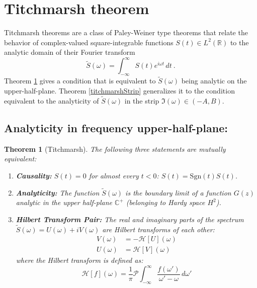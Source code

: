 \documentclass[a4paper,11pt]{article}
\newtheorem{theorem}{Theorem}
\theoremstyle{definition}
\begin{document}
\section{Titchmarsh theorem}\label{app:titchmarsh}

Titchmarsh theorems are a class of Paley-Weiner type theorems that relate the behavior of complex-valued square-integrable functions $S(t)\in L^2(\mathbb{R})$ to the analytic domain of their Fourier transform
\begin{equation}
    \tilde{S}(\omega) = \int_{-\infty}^{\infty} S(t) e^{i\omega t} \, dt\ .
\end{equation}
Theorem \ref{titchmarshUHP} gives a condition that is equivalent to $\tilde{S}(\omega)$ being analytic on the upper-half-plane. Theorem \ref{titchmarshStrip} generalizes it to the condition equivalent to the analyticity of $\tilde{S}(\omega)$ in the strip $\Im(\omega)\in (-A,B)$.

\subsection{Analyticity in frequency upper-half-plane:}
\begin{theorem}[Titchmarsh]\label{titchmarshUHP}
The following three statements are mutually equivalent:

\begin{enumerate}
    \item \textbf{Causality:} $S(t) = 0$ for almost every $t < 0$: $S(t)=\text{Sgn}(t)S(t)$.
    \item \textbf{Analyticity:} The function $\tilde{S}(\omega)$ is the boundary limit of a function $G(z)$ analytic in the upper half-plane $\mathbb{C}^+$ (belonging to Hardy space $H^2$).
    \item \textbf{Hilbert Transform Pair:}
    The real and imaginary parts of the spectrum $\tilde{S}(\omega) = U(\omega) + i V(\omega)$ are Hilbert transforms of each other:
    \begin{align}
        V(\omega) &= -\mathcal{H}[U](\omega) \\
        U(\omega) &= \mathcal{H}[V](\omega)
    \end{align}
    where the Hilbert transform is defined as:
    \begin{equation}
        \mathcal{H}[f](\omega) = \frac{1}{\pi} \mathcal{P} \int_{-\infty}^{\infty} \frac{f(\omega')}{\omega' - \omega} \, d\omega'
    \end{equation}
\end{enumerate}
\end{theorem}
\end{document}
